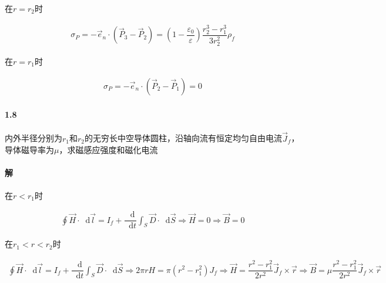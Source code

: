 \documentclass{article}
\newcommand*{\md}{\mathop{}\!\mathrm{d}}
\newcommand*{\Jmath}{J}
\begin{document}
在$r = r_2$时

\begin{equation*}
  \begin{aligned}
    \sigma_P = - \vec{e}_n \cdot \left( \vec{P}_3 - \vec{P}_2 \right) = \left( 1 - \dfrac{\varepsilon_0}{\varepsilon}  \right) \dfrac{r_2^3 - r_1^3}{3 r_2^2} \rho_f  
  \end{aligned}
\end{equation*}

在$r = r_1$时

\begin{equation*}
  \begin{aligned}
    \sigma_P = - \vec{e}_n \cdot \left( \vec{P}_2 - \vec{P}_1 \right) = 0
  \end{aligned}
\end{equation*}

\paragraph{1.8}

内外半径分别为$r_1$和$r_2$的无穷长中空导体圆柱，沿轴向流有恒定均匀自由电流$\vec{\Jmath}_f$，导体磁导率为$\mu$，求磁感应强度和磁化电流

\paragraph{解}

在$r<r_1$时

\begin{equation*}
  \begin{aligned}
    \oint \vec{H} \cdot \md \vec{l} = I_f + \dfrac{\md}{\md t} \int_S \vec{D} \cdot \md \vec{S}
    \Rightarrow
    \vec{H} = 0
    \Rightarrow
    \vec{B} = 0
  \end{aligned}
\end{equation*}

在$r_1<r<r_2$时

\begin{equation*}
  \begin{aligned}
    \oint \vec{H} \cdot \md \vec{l} = I_f + \dfrac{\md}{\md t} \int_S \vec{D} \cdot \md \vec{S}
    \Rightarrow
    2\pi r H = \pi \left( r^2 - r_1^2 \right) J_f
    \Rightarrow
    \vec{H} = \dfrac{r^2 - r_1^2}{2 r^2 } \vec{\Jmath}_f \times \vec{r} 
    \Rightarrow
    \vec{B} = \mu \dfrac{r^2 - r_1^2}{2 r^2 } \vec{\Jmath}_f \times \vec{r}
  \end{aligned}
\end{equation*}
\end{document}
